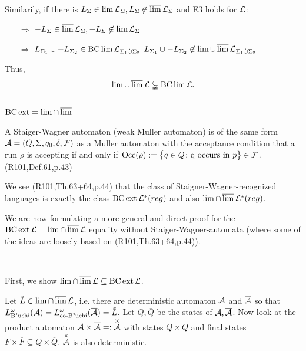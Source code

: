 Similarily, if there is $L_\Sigma \in \lim \mathcal{L}_\Sigma, L_\Sigma \not\in \operatorname{\overline{lim}} \mathcal{L}_\Sigma$ and E3 holds for $\mathcal{L}$:
\begin{itemize}
\item[$\Rightarrow$] $-L_\Sigma \in \operatorname{\overline{lim}} \mathcal{L}_\Sigma, -L_\Sigma \not\in \lim \mathcal{L}_\Sigma$
\item[$\Rightarrow$] $L_{\Sigma_1} \cup -L_{\Sigma_2} \in \operatorname{BC} \lim \mathcal{L}_{\Sigma_1 \dot{\cup} \Sigma_2}$ \newline
$L_{\Sigma_1} \cup -L_{\Sigma_2} \not\in \lim \cup \operatorname{\overline{lim}} \mathcal{L}_{\Sigma_1 \dot{\cup} \Sigma_2}$
\end{itemize}
Thus,
\[ \lim \cup \operatorname{\overline{lim}} \mathcal{L} \subsetneqq \operatorname{BC} \lim \mathcal{L} . \]


\subsection{$\operatorname{BC} \operatorname{ext} = \lim \cap \operatorname{\overline{lim}}$}
\label{gen:staiger-wagner}
A Staiger-Wagner automaton (weak Muller automaton) is of the same form $\mathcal{A} = (Q,\Sigma,q_0,\delta,\mathcal{F})$ as a Muller automaton with the acceptance condition that a run $\rho$ is accepting if and only if $\Occ(\rho) := \Set{q \in Q \colon \text{q occurs in } p} \in \F$.  (R101,Def.61,p.43)

We see (R101,Th.63+64,p.44) that the class of Staigner-Wagner-recognized languages is exactly the class $\operatorname{BC} \operatorname{ext} \mathcal{L}^*(reg)$ and also $\lim \cap \operatorname{\overline{lim}} \mathcal{L}^*(reg)$.

We are now formulating a more general and direct proof for the $\operatorname{BC} \operatorname{ext} \mathcal{L} = \lim \cap \operatorname{\overline{lim}} \mathcal{L}$ equality without Staiger-Wagner-automata (where some of the ideas are loosely based on (R101,Th.63+64,p.44)).

\

First, we show $\lim \cap \operatorname{\overline{lim}} \mathcal{L} \subseteq \operatorname{BC} \operatorname{ext} \mathcal{L}$.

Let $\tilde L \in \lim \cap \operatorname{\overline{lim}} \mathcal{L}$, i.e. there are deterministic automaton $\mathcal{A}$ and $\overline {\mathcal{A}}$ so that $L^\omega_{\text{B"uchi}}(\mathcal{A}) = L^\omega_{\text{co-B"uchi}}(\overline {\mathcal{A}}) = \tilde L$. Let $Q,\overline Q$ be the states of $\mathcal{A},\overline {\mathcal{A}}$. Now look at the product automaton $\mathcal{A} \times \overline {\mathcal{A}} =: \overset{\times}{\mathcal{A}}$ with states $Q \times \overline Q$ and final states $F \times \overline F \subseteq Q \times \overline Q$. $\overset{\times}{\mathcal{A}}$ is also deterministic.


